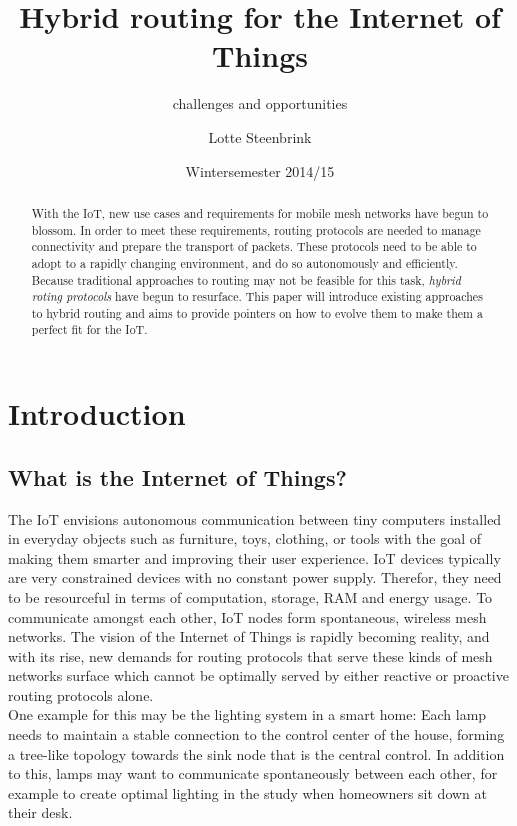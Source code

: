 \documentclass[a4paper,10pt]{scrartcl}
\begin{document}
\title{Hybrid routing for the Internet of Things}
\subtitle{challenges and opportunities}
\author{Lotte Steenbrink}
\date{Wintersemester 2014/15}
\maketitle

\begin{abstract}
With the \gls{IoT}, new use cases and requirements for mobile mesh networks have begun to blossom. In order to meet these requirements, routing protocols are needed to manage connectivity and prepare the transport of packets. These protocols need to be able to adopt to a rapidly changing environment, and do so autonomously and efficiently. Because traditional approaches to routing may not be feasible for this task, \emph{hybrid roting protocols} have begun to resurface. This paper will introduce existing approaches to hybrid routing and aims to provide pointers on how to evolve them to make them a perfect fit for the IoT.

\end{abstract}

\section{Introduction}
\label{sec:Intro}


\subsection{What is the Internet of Things?}
\label{subsec:IoT}
The \gls{IoT} envisions autonomous communication between tiny computers installed in everyday objects such as furniture, toys, clothing, or tools with the goal of making them smarter and improving their user experience. IoT devices typically are very constrained devices with no constant power supply. Therefor, they need to be resourceful in terms of computation, storage, RAM and energy usage.
To communicate amongst each other, IoT nodes form spontaneous, wireless mesh networks.
The vision of the Internet of Things is rapidly becoming reality, and with its rise, new demands for routing protocols that serve these kinds of mesh networks surface which cannot be optimally served by either reactive or proactive routing protocols alone.\\
One example for this may be the lighting system in a smart home: Each lamp needs to maintain a stable connection to the control center of the house, forming a tree-like topology towards the sink node that is the central control. In addition to this, lamps may want to communicate spontaneously between each other, for example to create optimal lighting in the study when homeowners sit down at their desk.
\end{document}
